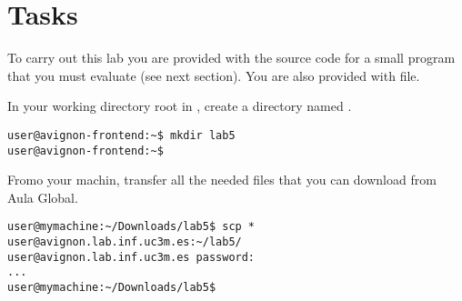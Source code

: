 \section{Tasks}

To carry out this lab you are provided with the source code for a small program that
you must evaluate (see next section).
You are also provided with  file.

In your working directory root in , create
a directory named .

\begin{lstlisting}[style=terminal,aboveskip=1em,belowskip=1em]
user@avignon-frontend:~$ mkdir lab5
user@avignon-frontend:~$
\end{lstlisting}

Fromo your machin, transfer all the needed files that you can download
from Aula Global.

\begin{lstlisting}[style=terminal,aboveskip=1em,belowskip=1em]
user@mymachine:~/Downloads/lab5$ scp * user@avignon.lab.inf.uc3m.es:~/lab5/
user@avignon.lab.inf.uc3m.es password: 
...
user@mymachine:~/Downloads/lab5$ 
\end{lstlisting}


